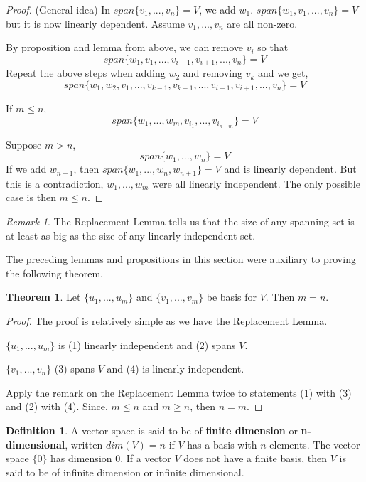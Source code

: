 \documentclass{report}
\theoremstyle{definition}
\newtheorem*{_def}{Definition}
\newtheorem{_thm}{Theorem}[section]
\theoremstyle{remark}
\newtheorem{_rem}{Remark}[section]
\begin{document}
\begin{proof} (General idea)
In $span\{v_1,...,v_n\}=V$, we add $w_1$.
$span\{w_1,v_1,...,v_n\}=V$ but it is now linearly dependent.
Assume $v_1,...,v_n$ are all non-zero.

By proposition and lemma from above, we can remove $v_i$ so that
\[span\{w_1,v_1,...,v_{i-1},v_{i+1},...,v_n\}=V\]
Repeat the above steps when adding $w_2$ and removing $v_k$ and we get,
\[span\{w_1,w_2,v_1,...,v_{k-1},v_{k+1},...,v_{i-1},v_{i+1},...,v_n\}=V\]

If $m\leq n$,
\[span\{w_1,...,w_m,v_{i_1},...,v_{i_{n-m}}\}=V\]

Suppose $m>n$,
\[span\{w_1,...,w_n\}=V\]
If we add $w_{n+1}$, then $span\{w_1,...,w_n,w_{n+1}\}=V$ and is linearly dependent.
But this is a contradiction, $w_1,...,w_m$ were all linearly independent.
The only possible case is then $m\leq n$.
\end{proof}

\begin{_rem}
The Replacement Lemma tells us that the size of any spanning set is at least as big as the size of any linearly independent set.
\end{_rem}

The preceding lemmas and propositions in this section were auxiliary to proving the following theorem.

\begin{_thm}
Let $\{u_1,...,u_m\}$ and $\{v_1,...,v_m\}$ be basis for $V$.
Then $m=n$.
\end{_thm}

\begin{proof}
The proof is relatively simple as we have the Replacement Lemma.

$\{u_1,...,u_m\}$ is (1) linearly independent and (2) spans $V$.

$\{v_1,...,v_n\}$ (3) spans $V$ and (4) is linearly independent.

Apply the remark on the Replacement Lemma twice to statements (1) with (3) and (2) with (4).
Since, $m\leq n$ and $m\geq n$, then $n=m$.
\end{proof}

\begin{_def}
A vector space is said to be of \textbf{finite dimension} or \textbf{n-dimensional}, written $dim(V)=n$ if $V$ has a basis with $n$ elements.
The vector space $\{0\}$ has dimension $0$.
If a vector $V$ does not have a finite basis, then $V$ is said to be of infinite dimension or infinite dimensional.
\end{_def}
\end{document}
